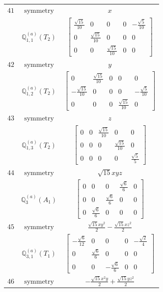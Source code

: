 \documentclass[fleqn,8pt,landscape]{jsarticle}
\begin{document}
\begin{longtable}{ccc}
$ 41 $ & $ \text{symmetry} $ & $ x $ \\
$  $ & $ \mathbb{Q}_{1,1}^{(a)}(T_{2}) $ & $ \begin{bmatrix} \frac{\sqrt{15}}{10} & 0 & 0 & 0 & - \frac{\sqrt{5}}{10} \\ 0 & \frac{\sqrt{15}}{10} & 0 & 0 & 0 \\ 0 & 0 & \frac{\sqrt{15}}{10} & 0 & 0 \end{bmatrix} $ \\ \hline
$ 42 $ & $ \text{symmetry} $ & $ y $ \\
$  $ & $ \mathbb{Q}_{1,2}^{(a)}(T_{2}) $ & $ \begin{bmatrix} 0 & \frac{\sqrt{15}}{10} & 0 & 0 & 0 \\ - \frac{\sqrt{15}}{10} & 0 & 0 & 0 & - \frac{\sqrt{5}}{10} \\ 0 & 0 & 0 & \frac{\sqrt{15}}{10} & 0 \end{bmatrix} $ \\ \hline
$ 43 $ & $ \text{symmetry} $ & $ z $ \\
$  $ & $ \mathbb{Q}_{1,3}^{(a)}(T_{2}) $ & $ \begin{bmatrix} 0 & 0 & \frac{\sqrt{15}}{10} & 0 & 0 \\ 0 & 0 & 0 & \frac{\sqrt{15}}{10} & 0 \\ 0 & 0 & 0 & 0 & \frac{\sqrt{5}}{5} \end{bmatrix} $ \\ \hline
$ 44 $ & $ \text{symmetry} $ & $ \sqrt{15} x y z $ \\
$  $ & $ \mathbb{Q}_{3}^{(a)}(A_{1}) $ & $ \begin{bmatrix} 0 & 0 & 0 & \frac{\sqrt{6}}{6} & 0 \\ 0 & 0 & \frac{\sqrt{6}}{6} & 0 & 0 \\ 0 & \frac{\sqrt{6}}{6} & 0 & 0 & 0 \end{bmatrix} $ \\ \hline
$ 45 $ & $ \text{symmetry} $ & $ \frac{\sqrt{15} x y^{2}}{2} - \frac{\sqrt{15} x z^{2}}{2} $ \\
$  $ & $ \mathbb{Q}_{3,1}^{(a)}(T_{1}) $ & $ \begin{bmatrix} - \frac{\sqrt{6}}{12} & 0 & 0 & 0 & - \frac{\sqrt{2}}{4} \\ 0 & \frac{\sqrt{6}}{6} & 0 & 0 & 0 \\ 0 & 0 & - \frac{\sqrt{6}}{6} & 0 & 0 \end{bmatrix} $ \\ \hline
$ 46 $ & $ \text{symmetry} $ & $ - \frac{\sqrt{15} x^{2} y}{2} + \frac{\sqrt{15} y z^{2}}{2} $ \\

\end{longtable}
\end{document}
